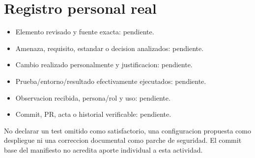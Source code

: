 \documentclass[12pt,a4paper]{report}
\providecommand{\tightlist}{\setlength{\itemsep}{0pt}\setlength{\parskip}{0pt}}
\begin{document}
\section{Registro personal
real}\label{AA5-semana-5-anexo3-registro-personal-real}

\begin{itemize}
\tightlist
\item
  Elemento revisado y fuente exacta: pendiente.
\item
  Amenaza, requisito, estandar o decision analizados: pendiente.
\item
  Cambio realizado personalmente y justificacion: pendiente.
\item
  Prueba/entorno/resultado efectivamente ejecutados: pendiente.
\item
  Observacion recibida, persona/rol y uso: pendiente.
\item
  Commit, PR, acta o historial verificable: pendiente.
\end{itemize}

No declarar un test omitido como satisfactorio, una configuracion
propuesta como despliegue ni una correccion documental como parche de
seguridad. El commit base del manifiesto no acredita aporte individual a
esta actividad.
\end{document}
